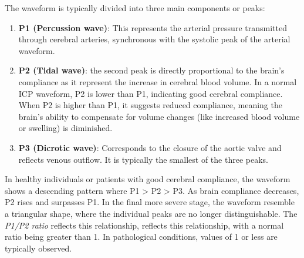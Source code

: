 The waveform is typically divided into three main components or peaks:
\begin{enumerate}
    \item \textbf{P1 (Percussion wave)}: This represents the arterial pressure transmitted through cerebral arteries, synchronous with the systolic peak of the arterial waveform.
    \item \textbf{P2 (Tidal wave)}: the second peak is directly proportional to the brain’s compliance as it represent the increase in cerebral blood volume. In a normal ICP waveform, P2 is lower than P1, indicating good cerebral compliance. When P2 is higher than P1, it suggests reduced compliance, meaning the brain’s ability to compensate for volume changes (like increased blood volume or swelling) is diminished.
    \item \textbf{P3 (Dicrotic wave)}: Corresponds to the closure of the aortic valve and reflects venous outflow. It is typically the smallest of the three peaks.
\end{enumerate}
In healthy individuals or patients with good cerebral compliance, the waveform shows a descending pattern where P1 > P2 > P3. As brain compliance decreases, P2 rises and surpasses P1. In the final more severe stage, the waveform resemble a triangular shape, where the individual peaks are no longer distinguishable.
The \textit {P1/P2 ratio} reflects this relationship, reflects this relationship, with a normal ratio being greater than 1. In pathological conditions, values of 1 or less are typically observed.\\

